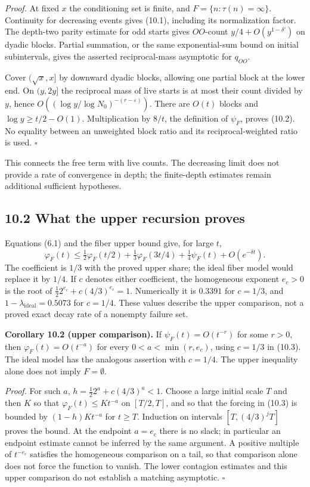 \documentclass[11pt,a4paper]{article}
\begin{document}
\emph{Proof.} At fixed \(x\) the conditioning set is finite, and
\(F=\{n:\tau(n)=\infty\}\). Continuity for decreasing events gives
(10.1), including its normalization factor. The depth-two parity
estimate for odd starts gives \(OO\)-count \(y/4+O(y^{1-\delta'})\) on
dyadic blocks. Partial summation, or the same exponential-sum bound on
initial subintervals, gives the asserted reciprocal-mass asymptotic for
\(q_{OO}\).

Cover \((\sqrt x,x]\) by downward dyadic blocks, allowing one partial
block at the lower end. On \((y,2y]\) the reciprocal mass of live starts
is at most their count divided by \(y\), hence
\(O((\log y/\log N_0)^{-(r-\varepsilon)})\). There are \(O(t)\) blocks
and \(\log y\ge t/2-O(1)\). Multiplication by \(8/t\), the definition of
\(\psi_F\), proves (10.2). No equality between an unweighted block ratio
and its reciprocal-weighted ratio is used. \(\square\)

This connects the free term with live counts. The decreasing limit does
not provide a rate of convergence in depth; the finite-depth estimates
remain additional sufficient hypotheses.

\subsection{10.2 What the upper recursion
proves}\label{what-the-upper-recursion-proves}

Equations (6.1) and the fiber upper bound give, for large \(t\), \[
\varphi_F(t)\le\tfrac12\varphi_F(t/2)
 +\tfrac13\varphi_F(3t/4)+\tfrac14\psi_F(t)+O(e^{-\delta t}).
\tag{10.3}
\] The coefficient is \(1/3\) with the proved upper share; the ideal
fiber model would replace it by \(1/4\). If \(c\) denotes either
coefficient, the homogeneous exponent \(e_c>0\) is the root of
\(\tfrac12 2^{e_c}+c(4/3)^{e_c}=1\). Numerically it is \(0.3391\) for
\(c=1/3\), and \(1-\lambda_{\mathrm{ideal}}=0.5073\) for \(c=1/4\).
These values describe the upper comparison, not a proved exact decay
rate of a nonempty failure set.

\textbf{Corollary 10.2 (upper comparison).} If \(\psi_F(t)=O(t^{-r})\)
for some \(r>0\), then \(\varphi_F(t)=O(t^{-a})\) for every
\(0<a<\min(r,e_c)\), using \(c=1/3\) in (10.3). The ideal model has the
analogous assertion with \(c=1/4\). The upper inequality alone does not
imply \(F=\emptyset\).

\emph{Proof.} For such \(a\), \(h=\tfrac12 2^a+c(4/3)^a<1\). Choose a
large initial scale \(T\) and then \(K\) so that
\(\varphi_F(t)\le Kt^{-a}\) on \([T/2,T]\), and so that the forcing in
(10.3) is bounded by \((1-h)Kt^{-a}\) for \(t\ge T\). Induction on
intervals \([T,(4/3)^jT]\) proves the bound. At the endpoint \(a=e_c\)
there is no slack; in particular an endpoint estimate cannot be inferred
by the same argument. A positive multiple of \(t^{-e_c}\) satisfies the
homogeneous comparison on a tail, so that comparison alone does not
force the function to vanish. The lower contagion estimates and this
upper comparison do not establish a matching asymptotic. \(\square\)
\end{document}
